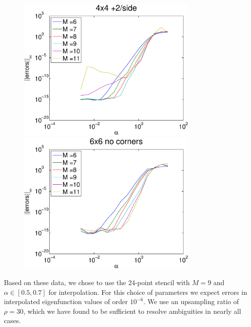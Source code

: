\documentclass{report}
\begin{document}
\begin{figure}
  \begin{center}
    \includegraphics[width=0.8\textwidth]{figs/interpolation/error_norms_3.eps}
    \linebreak
    \includegraphics[width=0.8\textwidth]{figs/interpolation/error_norms_4.eps}
  \end{center}
\end{figure}

Based on these data, we chose to use the 24-point stencil with $M=9$ and $\alpha \in [0.5, 0.7]$ for interpolation. For this choice of parameters we expect errors in interpolated eigenfunction values of order $10^{-6}$. We use an upsampling ratio of $\rho = 30$, which we have found to be sufficient to resolve ambiguities in nearly all cases.
\end{document}
